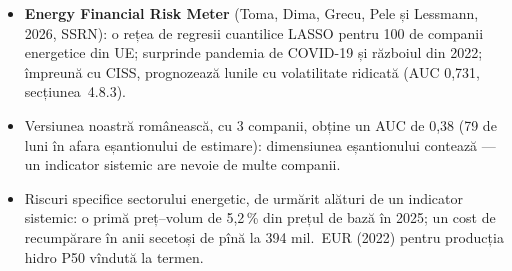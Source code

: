 \begin{itemize}\setlength{\itemsep}{2pt}
  \item \textbf{Energy Financial Risk Meter} (Toma, Dima, Grecu, Pele și Lessmann, 2026, SSRN): o rețea de regresii cuantilice LASSO pentru 100 de companii energetice din UE; surprinde pandemia de COVID-19 și războiul din 2022; împreună cu CISS, prognozează lunile cu volatilitate ridicată (AUC 0,731, secțiunea~4.8.3).
  \item Versiunea noastră românească, cu 3 companii, obține un AUC de 0,38 (79 de luni în afara eșantionului de estimare): dimensiunea eșantionului contează --- un indicator sistemic are nevoie de multe companii.
  \item Riscuri specifice sectorului energetic, de urmărit alături de un indicator sistemic: o primă preț--volum de 5,2\,\% din prețul de bază în 2025; un cost de recumpărare în anii secetoși de pînă la 394 mil.\ EUR (2022) pentru producția hidro P50 vîndută la termen.
\end{itemize}
